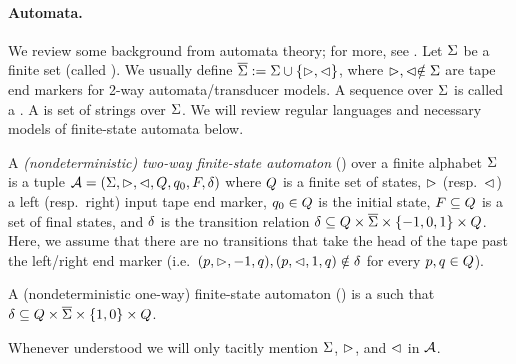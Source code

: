\paragraph{Automata.} We review some background from automata theory;
for more, see \cite{Kozen-automata,HU79}. Let $\Sigma$ be a finite set (called
). We usually define  $\overline{\Sigma} := \Sigma \cup \{\vartriangleright,\vartriangleleft\}$, where $\vartriangleright,\vartriangleleft\notin \Sigma$ are tape end markers for 2-way automata/transducer models. 
 A sequence over $\Sigma$ is called a . A  is set of strings over $\Sigma$.
We will review regular languages and necessary models of finite-state automata below.

\begin{definition} \label{def:2nfa}
    A \emph{(nondeterministic) two-way finite-state automaton}
(\FFA{}) over a finite alphabet $\Sigma$ is a tuple $\mathcal{A} =
(\Sigma, \vartriangleright, \vartriangleleft, Q, q_0, F, \delta)$ where 
    $Q$ is a finite set of 
    states, $\vartriangleright$ (resp.~$\vartriangleleft$) a left (resp.~right) input tape end 
    marker, $q_0\in Q$ is
the initial state, $F\subseteq Q$ is a set of final states, and 
    $\delta$ is the
transition relation  $\delta\subseteq Q \times 
    \overline{\Sigma}\times \{-1, 0, 1\}\times Q$. 
    Here, we assume %
    that
    there are no transitions that take the head of the tape past the left/right
    end marker (i.e.~$(p,\vartriangleright,-1,q), (p,\vartriangleleft,1,q) \notin
    \delta$ for every $p, q \in Q$).

A (nondeterministic one-way) finite-state automaton (\FA{})
is a \FFA{} such that $\delta \subseteq Q \times \overline{\Sigma} \times
    \{1,0\} \times Q $.
\end{definition}
Whenever understood we will only tacitly mention $\Sigma$, 
$\vartriangleright$, and $\vartriangleleft$ in $\mathcal{A}$. 


